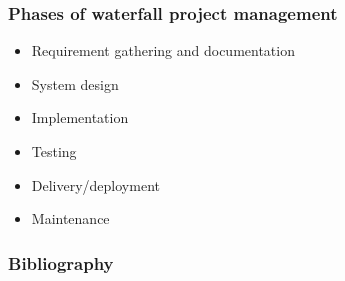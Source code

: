\documentclass[handout]{beamer}
\begin{document}
\begin{frame}
    \frametitle{Phases of waterfall project management}
    \begin{itemize}
        \setlength\itemsep{1em}
        \item Requirement gathering and documentation \pause
        \item System design \pause
        \item Implementation \pause
        \item Testing \pause
        \item Delivery/deployment \pause
        \item Maintenance
    \end{itemize}
\end{frame}


\nocite{*}
\begin{frame}
    \frametitle{Bibliography}

    
        

\end{frame}
\end{document}
